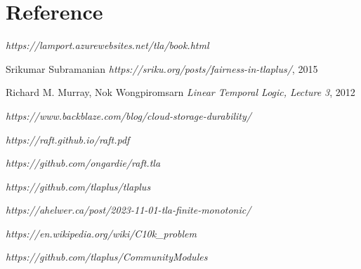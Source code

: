 \chapter{Reference}

\begin{thebibliography}{9}

\textit{https://lamport.azurewebsites.net/tla/book.html}

\bibitem{}
Srikumar Subramanian
\textit{https://sriku.org/posts/fairness-in-tlaplus/}, 2015

\bibitem{}
Richard M. Murray, Nok Wongpiromsarn
\textit{Linear Temporal Logic, Lecture 3}, 2012

\textit{https://www.backblaze.com/blog/cloud-storage-durability/}

\textit{https://raft.github.io/raft.pdf}

\textit{https://github.com/ongardie/raft.tla}

\textit{https://github.com/tlaplus/tlaplus}

\textit{https://ahelwer.ca/post/2023-11-01-tla-finite-monotonic/}

\textit{https://en.wikipedia.org/wiki/C10k\_problem}

\textit{https://github.com/tlaplus/CommunityModules}

\end{thebibliography}

